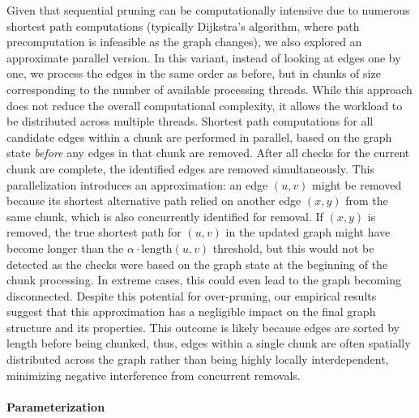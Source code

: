 Given that sequential pruning can be computationally intensive due to numerous shortest path computations (typically Dijkstra's algorithm, where path precomputation is infeasible as the graph changes), we also explored an approximate parallel version.
In this variant, instead of looking at edges one by one, we process the edges in the same order as before, but in chunks of size corresponding to the number of available processing threads.
While this approach does not reduce the overall computational complexity, it allows the workload to be distributed across multiple threads.
Shortest path computations for all candidate edges within a chunk are performed in parallel, based on the graph state \emph{before} any edges in that chunk are removed.
After all checks for the current chunk are complete, the identified edges are removed simultaneously.
This parallelization introduces an approximation: an edge \((u,v)\) might be removed because its shortest alternative path relied on another edge \((x,y)\) from the same chunk, which is also concurrently identified for removal.
If \((x,y)\) is removed, the true shortest path for \((u,v)\) in the updated graph might have become longer than the \(\alpha \cdot \text{length}(u,v)\) threshold, but this would not be detected as the checks were based on the graph state at the beginning of the chunk processing.
In extreme cases, this could even lead to the graph becoming disconnected.
Despite this potential for over-pruning, our empirical results suggest that this approximation has a negligible impact on the final graph structure and its properties.
This outcome is likely because edges are sorted by length before being chunked,
thus, edges within a single chunk are often spatially distributed across the graph rather than being highly locally interdependent, minimizing negative interference from concurrent removals.

\paragraph{Parameterization}

